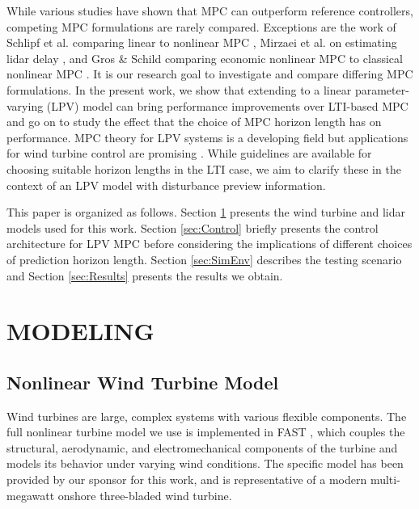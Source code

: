 \documentclass[letterpaper, 10 pt, conference]{ieeeconf}  %
\begin{document}
While various studies have shown that MPC can outperform reference controllers, competing MPC formulations are rarely compared. Exceptions are the work of Schlipf et al. comparing linear to nonlinear MPC \cite{Schlipf2014_2}, Mirzaei et al. on estimating lidar delay \cite{Mirzaei2013}, and Gros \& Schild comparing economic nonlinear MPC to classical nonlinear MPC \cite{Gros2017}. It is our research goal to investigate and compare differing MPC formulations. In the present work, we show that extending to a linear parameter-varying (LPV) model can bring performance improvements over LTI-based MPC and go on to study the effect that the choice of MPC horizon length has on performance. MPC theory for LPV systems is a developing field \cite{Wada2006}\cite{Satzger2017} but applications for wind turbine control are promising \cite{Bottasso2014}\cite{Soltani2011}\cite{Mirzaei2016}. While guidelines are available for choosing suitable horizon lengths \cite{Rossiter2018}\cite{Seborg2011} in the LTI case, we aim to clarify these in the context of an LPV model with disturbance preview information.

This paper is organized as follows. Section \ref{sec:Modeling} presents the wind turbine and lidar models used for this work. Section \ref{sec:Control} briefly presents the control architecture for LPV MPC before considering the implications of different choices of prediction horizon length. Section \ref{sec:SimEnv} describes the testing scenario and Section \ref{sec:Results} presents the results we obtain. 

\section{MODELING}\label{sec:Modeling}

\subsection{Nonlinear Wind Turbine Model}

Wind turbines are large, complex systems with various flexible components. The full nonlinear turbine model we use is implemented in FAST \cite{Jonkman2005}, which couples the structural, aerodynamic, and electromechanical components of the turbine and models its behavior under varying wind conditions. The specific model has been provided by our sponsor for this work, and is representative of a modern multi-megawatt onshore three-bladed wind turbine. 
\end{document}
